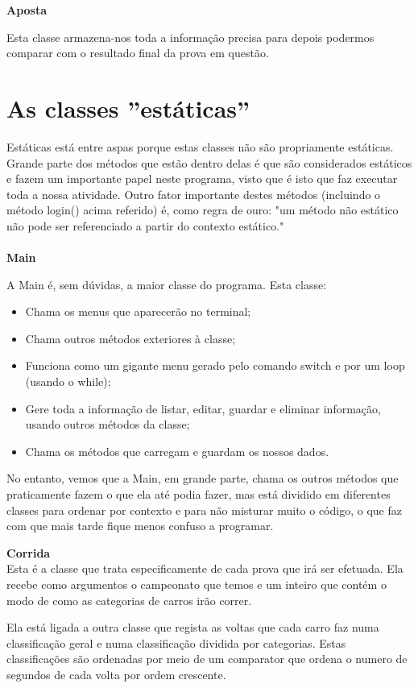 \documentclass[10pt]{article}
\begin{document}
\textbf{Aposta}

Esta classe armazena-nos toda a informação precisa para depois podermos comparar com o resultado final da prova em questão.

\pagebreak

\section{As classes ''estáticas''}

Estáticas está entre aspas porque estas classes não são propriamente estáticas. Grande parte dos métodos que estão dentro delas é que são considerados estáticos e fazem um importante papel neste programa, visto que é isto que faz executar toda a nossa atividade.
Outro fator importante destes métodos (incluindo o método login() acima referido) é, como regra de ouro: "um método não estático não pode ser referenciado a partir do contexto estático."
\\
\\

\textbf{Main}

A Main é, sem dúvidas, a maior classe do programa. Esta classe:

\begin{itemize}
\item Chama os menus que aparecerão no terminal;
\item Chama outros métodos exteriores à classe;
\item Funciona como um gigante menu gerado pelo comando switch e por um loop (usando o while);
\item Gere toda a informação de listar, editar, guardar e eliminar informação, usando outros métodos da classe;
\item Chama os métodos que carregam e guardam os nossos dados.
\end{itemize}

No entanto, vemos que a Main, em grande parte, chama os outros métodos que praticamente fazem o que ela até podia fazer, mas está dividido em diferentes classes para ordenar por contexto e para não misturar muito o código, o que faz com que mais tarde fique menos confuso a programar.

\textbf{Corrida}
\\
Esta é a classe que trata especificamente de cada prova que irá ser efetuada. Ela recebe como argumentos o campeonato que temos e um inteiro que contém o modo de como as categorias de carros irão correr.

Ela está ligada a outra classe que regista as voltas que cada carro faz numa classificação geral e numa classificação dividida por categorias. Estas classificações são ordenadas por meio de um comparator que ordena o numero de segundos de cada volta por ordem crescente.
\end{document}
